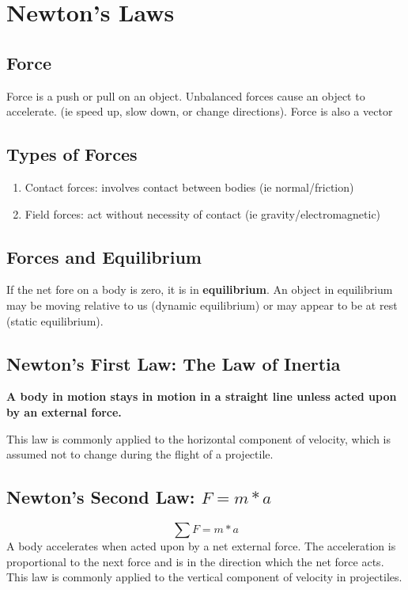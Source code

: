 \section{Newton's Laws}

\subsection{Force}
Force is a push or pull on an object. Unbalanced forces cause an object to accelerate. (ie speed up, slow down, or change directions). Force is also a vector

\subsection{Types of Forces}
\begin{center}
	\begin{enumerate}
		\item Contact forces: involves contact between bodies (ie normal/friction)
		\item Field forces: act without necessity of contact (ie gravity/electromagnetic)
	\end{enumerate}
\end{center}


\subsection{Forces and Equilibrium}
If the net fore on a body is zero, it is in \textbf{equilibrium}. An object in equilibrium may be moving relative to us (dynamic equilibrium) or may appear to be at rest (static equilibrium).

\subsection{Newton's First Law: The Law of Inertia}
\begin{center}
	\textbf{A body in motion stays in motion in a straight line unless acted upon by an external force.} 
\end{center}

This law is commonly applied to the horizontal component of velocity, which is assumed not to change during the flight of a projectile. 

\subsection{Newton's Second Law: $F=m*a$}
\[\sum F=m*a\]
A body accelerates when acted upon by a net external force. The acceleration is proportional to the next force and is in the direction which the net force acts. This law is commonly applied to the vertical component of velocity in projectiles. 


